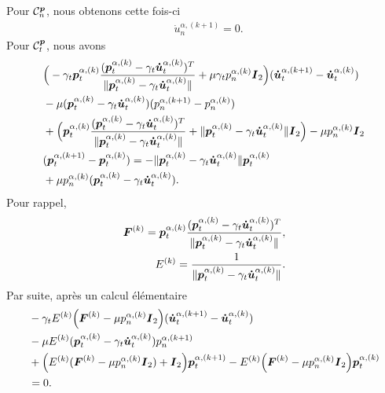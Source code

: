 \noindent Pour ${\cal C}_{n}^{\boldsymbol{p}}$, nous obtenons cette fois-ci 
\begin{align}
&\dot{u}^{\alpha,(k+1)}_n=0.
\end{align}
Pour ${\cal C}_{t}^{\boldsymbol{p}}$, nous avons
\begin{align}
&\Big(- \gamma_t \boldsymbol{p}^{\alpha,(k)}_t\frac{(\boldsymbol{p}^{\alpha,(k)}_t - \gamma_t \boldsymbol{\dot{u}}^{\alpha,(k)}_t)^T}{\|\boldsymbol{p}^{\alpha,(k)}_t - \gamma_t \boldsymbol{\dot{u}}^{\alpha,(k)}_t\|}+\mu \gamma_t p^{\alpha,(k)}_n\mbox{\boldmath{$I$}}_2\Big)(\boldsymbol{\dot{u}}^{\alpha,(k+1)}_t-\boldsymbol{\dot{u}}^{\alpha,(k)}_t) \label{phi2c_gran}\\
&  - \mu (\boldsymbol{p}^{\alpha,(k)}_t - \gamma_t \boldsymbol{\dot{u}}^{\alpha,(k)}_t)(p^{\alpha,(k+1)}_n-p^{\alpha,(k)}_n)\nonumber\\
& +\Big( \boldsymbol{p}^{\alpha,(k)}_t\frac{(\boldsymbol{p}^{\alpha,(k)}_t - \gamma_t \boldsymbol{\dot{u}}^{\alpha,(k)}_t)^T}{\|\boldsymbol{p}^{\alpha,(k)}_t - \gamma_t \boldsymbol{\dot{u}}^{\alpha,(k)}_t\|} +\|\boldsymbol{p}^{\alpha,(k)}_t - \gamma_t \boldsymbol{\dot{u}}^{\alpha,(k)}_t\|\mbox{\boldmath{$I$}}_2\Big) - \mu p^{\alpha,(k)}_n\mbox{\boldmath{$I$}}_2\nonumber\\
& (\boldsymbol{p}^{\alpha,(k+1)}_t-\boldsymbol{p}^{\alpha,(k)}_t) = - \|\boldsymbol{p}^{\alpha,(k)}_t - \gamma_t \boldsymbol{\dot{u}}^{\alpha,(k)}_t\|\boldsymbol{p}^{\alpha,(k)}_t\nonumber\\
& + \mu p^{\alpha,(k)}_n (\boldsymbol{p}^{\alpha,(k)}_t - \gamma_t \boldsymbol{\dot{u}}^{\alpha,(k)}_t)\nonumber.
\end{align}
\noindent Pour rappel,
\begin{align*}
\mbox{\boldmath{$F$}}^{(k)}= \boldsymbol{p}^{\alpha,(k)}_t\frac{(\boldsymbol{p}^{\alpha,(k)}_t - \gamma_t \boldsymbol{\dot{u}}^{\alpha,(k)}_t)^T}{\|\boldsymbol{p}^{\alpha,(k)}_t - \gamma_t \boldsymbol{\dot{u}}^{\alpha,(k)}_t\|},\\
E^{(k)}=\frac{1}{\|\boldsymbol{p}^{\alpha,(k)}_t - \gamma_t \boldsymbol{\dot{u}}^{\alpha,(k)}_t\|}.
\end{align*}
\noindent Par suite, après un calcul élémentaire
\begin{align*}
&- \gamma_t E^{(k)}\Big( \mbox{\boldmath{$F$}}^{(k)}-\mu  p^{\alpha,(k)}_n\mbox{\boldmath{$I$}}_2\Big)(\boldsymbol{\dot{u}}^{\alpha,(k+1)}_t-\boldsymbol{\dot{u}}^{\alpha,(k)}_t)\\
& - \mu E^{(k)} (\boldsymbol{p}^{\alpha,(k)}_t - \gamma_t \boldsymbol{\dot{u}}^{\alpha,(k)}_t)p^{\alpha,(k+1)}_n\\
& +\Big( E^{(k)}(\mbox{\boldmath{$F$}}^{(k)}- \mu p^{\alpha,(k)}_n\mbox{\boldmath{$I$}}_2 )+\mbox{\boldmath{$I$}}_2  \Big)\boldsymbol{p}^{\alpha,(k+1)}_t -E^{(k)}\Big( \mbox{\boldmath{$F$}}^{(k)} - \mu p^{\alpha,(k)}_n\mbox{\boldmath{$I$}}_2  \Big)\boldsymbol{p}^{\alpha,(k)}_t\\
& = 0\nonumber.
\end{align*}
